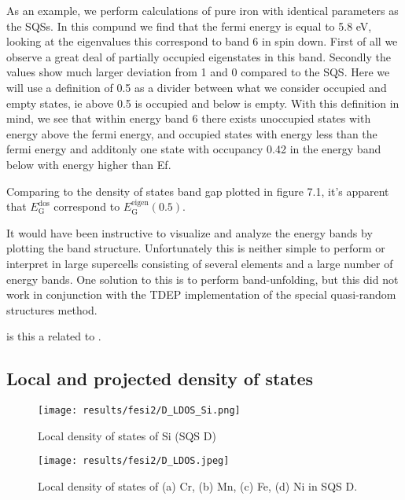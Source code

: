 As an example, we perform calculations of pure iron with identical parameters as the SQSs. In this compund we find that the fermi energy is equal to 5.8 eV, looking at the eigenvalues this correspond to band 6 in spin down. First of all we observe a great deal of partially occupied eigenstates in this band. Secondly the values show much larger deviation from 1 and 0 compared to the SQS. Here we will use a definition of 0.5 as a divider between what we consider occupied and empty states, ie above 0.5 is occupied and below is empty. With this definition in mind, we see that within energy band 6 there exists unoccupied states with energy above the fermi energy, and occupied states with energy less than the fermi energy and additonly one state with occupancy 0.42 in the energy band below with energy higher than Ef. 
 


Comparing to the density of states band gap plotted in figure 7.1, it's apparent that $E_\text{G} ^\text{dos}$ correspond to $E_\text{G} ^\text{eigen}(0.5)$. 


It would have been instructive to visualize and analyze the energy bands by plotting the band structure. Unfortunately this is neither simple to perform or interpret in large supercells consisting of several elements and a large number of energy bands. One solution to this is to perform band-unfolding, but this did not work in conjunction with the TDEP implementation of the special quasi-random structures method.

is this a related to \cite{PhysRevLett.104.236403}.



\newpage
\subsection{Local and projected density of states}
  
\begin{figure}[H]
	\centering
	\texttt{[image: results/fesi2/D\_LDOS\_Si.png]}
	\caption{Local density of states of Si (SQS D)}
\end{figure} 

\begin{figure}[H]
	\centering
	\texttt{[image: results/fesi2/D\_LDOS.jpeg]}
	\caption{Local density of states of (a) Cr, (b) Mn, (c) Fe, (d) Ni in SQS D.}
\end{figure}   
  
